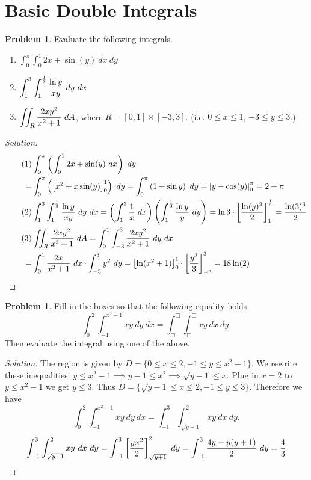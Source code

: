 \documentclass[12pt]{amsart}%
\theoremstyle{plain}
\theoremstyle{definition}
\newtheorem{prob}[theorem]{Problem}
\theoremstyle{special}
\newcommand{\sol}[1]{
{\begin{proof}[Solution]#1\end{proof}}
}
\newcommand{\Prob}[1]{\begin{tcolorbox}%
\begin{prob}
	#1
\end{prob}
\end{tcolorbox}	
}
\begin{document}
\section{Basic Double Integrals}
\Prob{Evaluate the following integrals.
\begin{enumerate}
\item $\displaystyle \int_0^\pi \int_0^1 2x+\sin (y)\ dx \ dy$\vspace{0.5cm}
	\item $\displaystyle\int_1^3\int_1^{1\over 3}{\ln y\over xy}\ dy\ dx $\vspace{0.5cm}
	\item $\displaystyle\iint_R {2xy^2\over x^2+1}\ dA$, where $R=[0,1]\times [-3,3]$. (i.e. $0\leq x\leq 1$, $-3\leq y\leq 3$.)
\end{enumerate} }
\sol{
\begin{align*}
	\tag{1}&\int_0^\pi \left(\int_0^1 2x+\sin (y)\ dx\right) \ dy\\
	=&\int_0^\pi\left(\left[{x^2}+x\sin(y)\right]_0^1 \right)\ dy
	=\int_0^\pi \left(1+\sin y\right)\ dy
	=\left[y-\cos(y)\right]_0^\pi=2+\pi\\
	\tag{2}&\int_1^3\int_1^{1\over 3}{\ln y\over xy}\ dy\ dx=\left(\int_1^3{1\over x}\ dx\right)\left(\int_1^{1\over 3}{\ln y\over y}\ dy\right)=\ln 3\cdot \left[ \ln(y)^2\over 2\right]_1^{1\over 3}={\ln(3)^3\over 2} \\
	\tag{3}&\iint_R {2xy^2\over x^2+1}\ dA=\int_0^1\int_{-3}^3 {2xy^2\over x^2+1}\ dy\ dx\\
	=&\int_0^1 {2x\over x^2+1}\ dx\cdot \int_{-3}^3 y^2\ dy= \left[\ln(x^2+1)\right]_0^1\cdot \left[{y^3\over 3}\right]_{-3}^{3}=18\ln(2)\qedhere
\end{align*}
}
\Prob{Fill in the boxes so that the following equality holds
\[\int_{0}^{2}\int_{-1}^{x^2-1} xy \ d y\ d x=\int_{\Box}^{\Box} \int_{\Box}^{\Box} xy\ dx\ dy.\]
Then evaluate the integral using one of the above.}
\sol{The region is given by $D=\{0\leq x\leq 2,-1\leq y\leq x^2-1\}$. We rewrite these inequalities: $y\leq x^2-1\implies y-1\leq x^2\implies \sqrt{y-1}\leq x$. Plug in $x=2$ to $y\leq x^2-1$ we get $y\leq 3$. Thus $D=\{\sqrt{y-1}\leq x\leq 2,-1\leq y\leq 3\}$. Therefore we have
\[\int_{0}^{2}\int_{-1}^{x^2-1} xy \ d y\ d x=\int_{-1}^3 \int_{\sqrt{y+1}}^{2} xy\ dx\ dy.\]
\[\int_{-1}^3 \int_{\sqrt{y+1}}^{2} xy\ dx\ dy=\int_{-1}^3\left[yx^2\over 2\right]_{\sqrt{y+1}}^{2}\ dy=\int_{-1}^3{4y-y(y+1)\over 2}\ dy={4\over 3}\qedhere\]

\qedhere}
\end{document}

